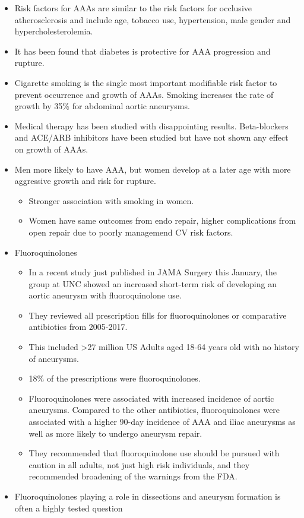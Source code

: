 \documentclass[
]{book}
\begin{document}
\begin{itemize}
\item
  Risk factors for AAAs are similar to the risk factors for occlusive
  atherosclerosis and include age, tobacco use, hypertension, male
  gender and hypercholesterolemia.
\item
  It has been found that diabetes is protective for AAA progression
  and rupture.
\item
  Cigarette smoking is the single most important modifiable risk
  factor to prevent occurrence and growth of AAAs. Smoking increases
  the rate of growth by 35\% for abdominal aortic aneurysms.
\item
  Medical therapy has been studied with disappointing results.
  Beta-blockers and ACE/ARB inhibitors have been studied but have not
  shown any effect on growth of AAAs.
\item
  Men more likely to have AAA, but women develop at a later age with
  more aggressive growth and risk for rupture.
  \citep{loAbdominalAorticAneurysms2016}

  \begin{itemize}
  \item
    Stronger association with smoking in women.
  \item
    Women have same outcomes from endo repair, higher complications
    from open repair due to poorly managemend CV risk factors.
  \end{itemize}
\item
  Fluoroquinolones

  \begin{itemize}
  \item
    In a recent study just published in JAMA Surgery this January,
    the group at UNC showed an increased short-term risk of
    developing an aortic aneurysm with fluoroquinolone use.
    \citep{newtonAssociationFluoroquinoloneUse2021a}
  \item
    They reviewed all prescription fills for fluoroquinolones or
    comparative antibiotics from 2005-2017.
  \item
    This included \textgreater27 million US Adults aged 18-64 years old with no
    history of aneurysms.
  \item
    18\% of the prescriptions were fluoroquinolones.
  \item
    Fluoroquinolones were associated with increased incidence of
    aortic aneurysms. Compared to the other antibiotics,
    fluoroquinolones were associated with a higher 90-day incidence
    of AAA and iliac aneurysms as well as more likely to undergo
    aneurysm repair.
  \item
    They recommended that fluoroquinolone use should be pursued with
    caution in all adults, not just high risk individuals, and they
    recommended broadening of the warnings from the FDA.
  \end{itemize}
\item
  Fluoroquinolones playing a role in dissections and aneurysm
  formation is often a highly tested question
\end{itemize}
\end{document}
